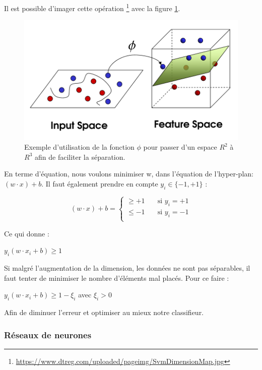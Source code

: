 \documentclass[a4paper, 11pt]{article}
\begin{document}
Il est possible d'imager cette opération \footnote{\url{https://www.dtreg.com/uploaded/pageimg/SvmDimensionMap.jpg}} avec la figure \ref{svm_exemple_phi}.
\begin{figure}[H]
\centering
\label{svm_exemple_phi}
\includegraphics[scale=0.3]{images/svm_exemple_phi}
\caption{Exemple d'utilisation de la fonction $\phi$ pour passer d'un espace $R^2$ à $R^3$ afin de faciliter la séparation.}
\end{figure}


En terme d'équation, nous voulons minimiser w, dans l'équation de l'hyper-plan: $(w \cdot x) + b$. Il faut également prendre
en compte $y_i \in \{-1,+1\}$ :
\begin{center}
 \[ (w \cdot x) + b =
  \begin{cases}
    \ge +1   & \quad \text{si $y_i = +1$}\\
    \le -1 & \quad \text{si $y_i = -1$}\\
  \end{cases}
\]
\end{center}

 Ce qui donne \cite{svm_equation}:
\begin{center}
$y_i (w \cdot x_i + b) \ge 1$
\end{center}
Si malgré l'augmentation de la dimension, les données ne sont pas séparables, 
il faut tenter de minimiser le nombre d'éléments mal placés. Pour ce faire \cite{svm_equation}:
\begin{center}
$y_i (w \cdot x_i + b) \ge 1 - \xi_i$ avec $\xi_i > 0$ 
\end{center}
Afin de diminuer l'erreur et optimiser au mieux notre classifieur.


\subsubsection{Réseaux de neurones}
\end{document}
